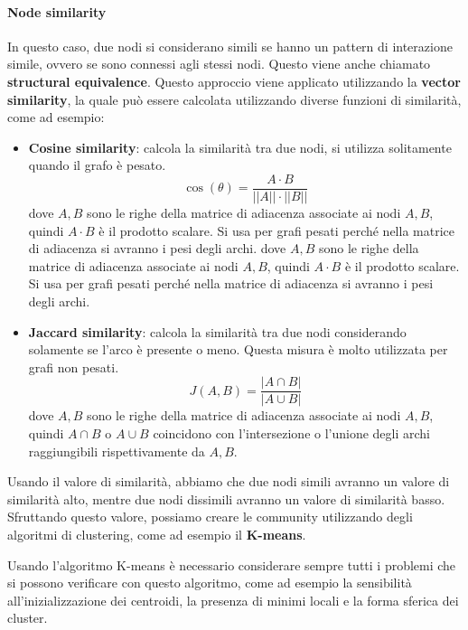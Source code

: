 \paragraph{Node similarity}
In questo caso, due nodi si considerano simili se hanno un pattern di interazione
simile, ovvero se sono connessi agli stessi nodi. Questo viene anche chiamato
\textbf{structural equivalence}. Questo approccio viene applicato utilizzando la
\textbf{vector similarity}, la quale può essere calcolata utilizzando diverse
funzioni di similarità, come ad esempio:
\begin{itemize}
    \item \textbf{Cosine similarity}: calcola la similarità tra due nodi, si
          utilizza solitamente quando il grafo è pesato.
          \begin{equation*}
              \cos(\theta) = \frac{A \cdot B}{||A|| \cdot ||B||}
          \end{equation*}
          dove $A,B$ sono le righe della matrice di adiacenza associate ai nodi $A,B$,
          quindi $A\cdot B$ è il prodotto scalare. Si usa per grafi pesati perché
          nella matrice di adiacenza si avranno i pesi degli archi.
          dove $A,B$ sono le righe della matrice di adiacenza associate ai nodi $A,B$,
          quindi $A\cdot B$ è il prodotto scalare. Si usa per grafi pesati perché
          nella matrice di adiacenza si avranno i pesi degli archi.
    \item \textbf{Jaccard similarity}: calcola la similarità tra due nodi
          considerando solamente se l'arco è presente o meno. Questa misura
          è molto utilizzata per grafi non pesati.
          \begin{equation*}
              J(A, B) = \frac{|A \cap B|}{|A \cup B|}
          \end{equation*}
          dove $A,B$ sono le righe della matrice di adiacenza associate ai nodi $A,B$,
          quindi $A\cap B$ o $A\cup B$ coincidono con l'intersezione o l'unione degli
          archi raggiungibili rispettivamente da $A,B$.
\end{itemize}
Usando il valore di similarità, abbiamo che due nodi simili avranno un valore
di similarità alto, mentre due nodi dissimili avranno un valore di similarità
basso. Sfruttando questo valore, possiamo creare le community utilizzando
degli algoritmi di clustering, come ad esempio il \textbf{K-means}.
\begin{nota}
    Usando l'algoritmo K-means è necessario considerare sempre tutti i problemi
    che si possono verificare con questo algoritmo, come ad esempio la sensibilità
    all'inizializzazione dei centroidi, la presenza di minimi locali e la forma
    sferica dei cluster.
\end{nota}
